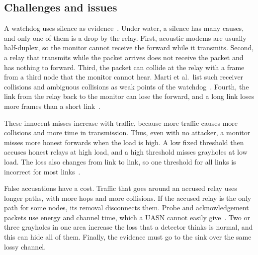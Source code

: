 \documentclass[11pt]{article}
\begin{document}
\subsection{Challenges and issues}\label{sec:challenges}
\noindent
A watchdog uses silence as evidence~\cite{marti2000}.
Under water, a silence has many causes, and only one of them is a drop by the relay.
First, acoustic modems are usually half-duplex, so the monitor cannot receive the forward while it transmits.
Second, a relay that transmits while the packet arrives does not receive the packet and has nothing to forward.
Third, the packet can collide at the relay with a frame from a third node that the monitor cannot hear.
Marti et al.\ list such receiver collisions and ambiguous collisions as weak points of the watchdog~\cite{marti2000}.
Fourth, the link from the relay back to the monitor can lose the forward, and a long link loses more frames than a short link~\cite{akyildiz2005}.

These innocent misses increase with traffic, because more traffic causes more collisions and more time in transmission.
Thus, even with no attacker, a monitor misses more honest forwards when the load is high.
A low fixed threshold then accuses honest relays at high load, and a high threshold misses grayholes at low load.
The loss also changes from link to link, so one threshold for all links is incorrect for most links~\cite{shila2010}.

False accusations have a cost.
Traffic that goes around an accused relay uses longer paths, with more hops and more collisions.
If the accused relay is the only path for some nodes, its removal disconnects them.
Probe and acknowledgement packets use energy and channel time, which a UASN cannot easily give~\cite{akyildiz2005,brc2021}.
Two or three grayholes in one area increase the loss that a detector thinks is normal, and this can hide all of them.
Finally, the evidence must go to the sink over the same lossy channel.
\end{document}

